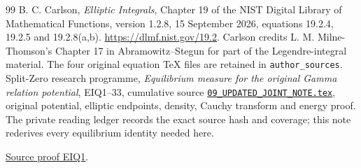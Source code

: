 \documentclass[11pt]{article}
\begin{document}
\begin{thebibliography}{99}
 B. C. Carlson, \emph{Elliptic Integrals}, Chapter 19 of
the NIST Digital Library of Mathematical Functions, version 1.2.8,
15 September 2026, equations 19.2.4, 19.2.5 and 19.2.8(a,b).
\url{https://dlmf.nist.gov/19.2}. Carlson credits L. M. Milne-Thomson's
Chapter 17 in Abramowitz--Stegun for part of the Legendre-integral material.
The four original equation TeX files are retained in \texttt{author\_sources}.
 Split-Zero research programme, \emph{Equilibrium measure for
the original Gamma relation potential}, EIQ1--33, cumulative source
\href{https://github.com/KokunoYumeto/zeta-function-research-reader/blob/5992ad50c0f2a06921f1fcaded7b4e38097c0739/workbenches/splitzero-tandem/continuations/20260920-original-kernel-mixed-determinants/cumulative/09_UPDATED_JOINT_NOTE.tex\#L1}{\texttt{09\_UPDATED\_JOINT\_NOTE.tex}}, original potential, elliptic endpoints,
density, Cauchy transform and energy proof. The private reading ledger
records the exact source hash and coverage; this note rederives every
equilibrium identity needed here.


\href{https://github.com/KokunoYumeto/zeta-function-research-reader/blob/5992ad50c0f2a06921f1fcaded7b4e38097c0739/workbenches/splitzero-tandem/continuations/20260920-original-kernel-mixed-determinants/cumulative/09_UPDATED_JOINT_NOTE.tex\#L4386}{Source proof EIQ1}.
\end{thebibliography}
\end{document}
